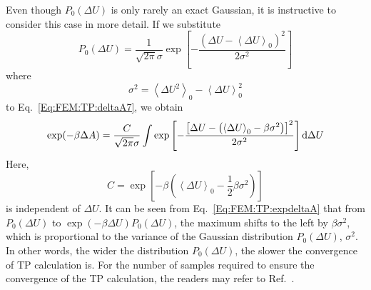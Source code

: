 Even though $P_{0}(\Delta U)$ is only rarely an exact Gaussian, it is instructive to consider this case in more detail. If we substitute
\begin{equation}
  P_{0}(\Delta U) = \frac{1}{\sqrt{2\pi}\sigma}\exp{\left[-\frac{(\Delta U - \left \langle \Delta U \right \rangle_{0})^2}{2\sigma^2}\right]}
  \label{Eq:FEM:TP:gaussian}
\end{equation}
where
\begin{equation}
  \sigma^2 = \left \langle \Delta U^2 \right \rangle_{0} - \left \langle \Delta U \right \rangle_{0}^2
  \label{Eq:FEM:TP:variance}
\end{equation}
to Eq.~\ref{Eq:FEM:TP:deltaA7}, we obtain
\begin{equation}
  \exp(-\beta \Delta A) = \frac{C}{\sqrt{2\pi}\sigma} \int \exp{\left[-\frac{\left[\Delta U - \left(\left \langle \Delta U \right \rangle_{0} - \beta \sigma ^2\right)\right]^2}{2\sigma^2}\right]} \mathop{}\!\mathrm{d}\Delta U
  \label{Eq:FEM:TP:expdeltaA}
\end{equation}
Here,
\begin{equation}
  C = \exp{\left[-\beta \left(\left \langle \Delta U \right \rangle_{0} - \frac{1}{2} \beta \sigma ^2\right)\right]}
  \label{Eq:FEM:TP:C}
\end{equation}
is independent of $\Delta U$. It can be seen from Eq.~\ref{Eq:FEM:TP:expdeltaA} that from $P_{0}(\Delta U)$ to $\exp{(-\beta \Delta U)}P_{0}(\Delta U)$, the maximum shifts to the left by $\beta \sigma ^2$, which is proportional to the variance of the Gaussian distribution $P_{0}(\Delta U)$, $\sigma^2$. In other words, the wider the distribution $P_{0}(\Delta U)$, the slower the convergence of TP calculation is. For the number of samples required to ensure the convergence of the TP calculation, the readers may refer to Ref.~\cite{GorePNAS2003}.

